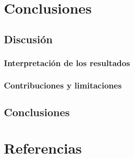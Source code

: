 \documentclass[
  letterpaper,
  DIV=11,
  numbers=noendperiod]{scrreport}
\begin{document}

\chapter{Conclusiones}\label{conclusiones}

\section{Discusión}\label{discusiuxf3n}

\subsection{Interpretación de los
resultados}\label{interpretaciuxf3n-de-los-resultados}

\subsection{Contribuciones y
limitaciones}\label{contribuciones-y-limitaciones}

\section{Conclusiones}\label{conclusiones-1}


\chapter*{Referencias}\label{referencias}

\end{document}
